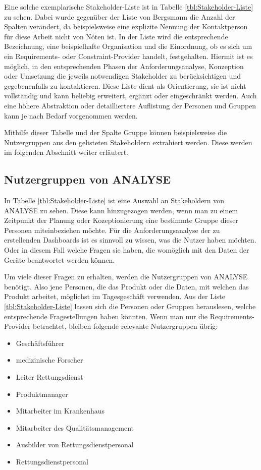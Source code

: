 Eine solche exemplarische Stakeholder-Liste ist in Tabelle \ref{tbl:Stakeholder-Liste} zu sehen.
Dabei wurde gegenüber der Liste von Bergsmann die Anzahl der Spalten verändert, da beispielsweise eine explizite Nennung der Kontaktperson für diese Arbeit nicht von Nöten ist.
In der Liste wird die entsprechende Bezeichnung, eine beispielhafte Organisation und die Einordnung, ob es sich um ein Requirements- oder Constraint-Provider handelt, festgehalten.
Hiermit ist es möglich, in den entsprechenden Phasen der Anforderungsanalyse, Konzeption oder Umsetzung die jeweils notwendigen Stakeholder zu berücksichtigen und gegebenenfalls zu kontaktieren. 
Diese Liste dient als Orientierung, sie ist nicht vollständig und kann beliebig erweitert, ergänzt oder eingeschränkt werden.
Auch eine höhere Abstraktion oder detailliertere Auflistung der Personen und Gruppen kann je nach Bedarf vorgenommen werden. 

Mithilfe dieser Tabelle und der Spalte \glqq Gruppe\grqq{} können beispielsweise die Nutzergruppen aus den gelisteten Stakeholdern extrahiert werden.
Diese werden im folgenden Abschnitt weiter erläutert.

\subsection{Nutzergruppen von \acrlong*{ANALYSE}}
\label{sub:NutzergruppenAnalyse}
In Tabelle \ref{tbl:Stakeholder-Liste} ist eine Auswahl an Stakeholdern von \gls{ANALYSE} zu sehen.
Diese kann hinzugezogen werden, wenn man zu einem Zeitpunkt der Planung oder Kozeptionierung eine bestimmte Gruppe dieser Personen miteinbeziehen möchte.
Für die Anforderungsanalyse der zu erstellenden \gls{Dashboard}s ist es sinnvoll zu wissen, was die Nutzer haben möchten.
Oder in diesem Fall welche Fragen sie haben, die womöglich mit den Daten der Geräte beantwortet werden können.

Um viele dieser Fragen zu erhalten, werden die Nutzergruppen von \gls{ANALYSE} benötigt.
Also jene Personen, die das Produkt oder die Daten, mit welchen das Produkt arbeitet, möglichst im Tagesgeschäft verwenden.
Aus der Liste \ref{tbl:Stakeholder-Liste} lassen sich die Personen oder Gruppen herauslesen, welche entsprechende Fragestellungen haben könnten. 
Wenn man nur die Requirements-Provider betrachtet, bleiben folgende relevante Nutzergruppen übrig:
\begin{multicols}{2}
\begin{itemize}
\item Geschäftsführer
\item medizinische Forscher
\item Leiter Rettungsdienst
\item Produktmanager
\item Mitarbeiter im Krankenhaus
\item Mitarbeiter des Qualitätsmanagement
\item Ausbilder von Rettungsdienstpersonal
\item Rettungsdienstpersonal
\end{itemize}
\end{multicols}

